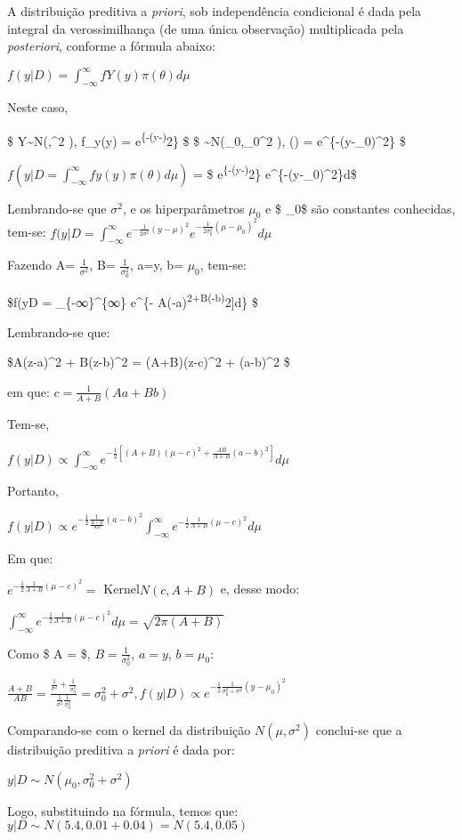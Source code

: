 \documentclass[
]{article}
\begin{document}
A distribuição preditiva a \emph{priori}, sob independência condicional
é dada pela integral da verossimilhança (de uma única observação)
multiplicada pela \emph{posteriori}, conforme a fórmula abaixo:

\(f(y|D) = \int_{-∞}^{∞} fY(y)π(θ)dμ\)

Neste caso,

\$ Y\textasciitilde N(\mu,\sigma\^{}2 ), f\_y(y) =
e\textsuperscript{\{-(y-\mu)}2\}
\$ \$ \theta\textasciitilde N(\mu\_0,\sigma\_0\^{}2 ), \pi(\theta) =
e\^{}\{-(y-\mu\_0)\^{}2\}
\$

\(f(y|D = \int_{-∞}^{∞}fy(y)π(θ)dμ )\) = \$
e\textsuperscript{\{-(y-\mu)}2\}
e\^{}\{-(y-\mu\_0)\^{}2\}d\mu\$

Lembrando-se que \(\sigma^2\), e os hiperparâmetros \(\mu_0\) e \$
\sigma\_0\$ são constantes conhecidas, tem-se:
\(f(y|D = \int_{-∞}^{∞} e^{-\frac{1}{2 \sigma^2}(y-\mu)^2}e^{-\frac{1}{2 \sigma_0^2}(\mu-\mu_0)^2}d\mu\)

Fazendo A= \(\frac{1}{\sigma^2}\), B= \(\frac{1}{\sigma_0^2}\), a=y, b=
\(\mu_0\), tem-se:

\$f(y\textbar D = \int\_\{-∞\}\^{}\{∞\} e\^{}\{-
\frac{1}{2}{[}A(\mu-a)\textsuperscript{2+B(\mu-b)}2{]}d\mu\} \$

Lembrando-se que:

\$A(z-a)\^{}2 + B(z-b)\^{}2 = (A+B)(z-c)\^{}2 + (a-b)\^{}2
\$

em que: \(c = \frac{1}{A+B}(Aa+Bb)\)

Tem-se,

\(f(y|D)∝\int_{-∞}^{∞}e^{-\frac{1}{2}[(A+B)(μ−c)^2+\frac{AB}{A+B}(a-b)^2]}d\mu\)

Portanto,

\(f(y|D)∝e^{-\frac{1}{2}\frac{1}{\frac{A+B}{AB}}(a-b)^2}\int_{-∞}^{∞}e^{-\frac{1}{2}\frac{1}{A+B}(μ−c)^2}d\mu\)

Em que:

\(e^{-\frac{1}{2}\frac{1}{A+B}(\mu−c)^2} =\) Kernel\(N(c, A+B)\) e,
desse modo:

\(\int_{-∞}^{∞}e^{-\frac{1}{2}\frac{1}{A+B}(\mu−c)^2}dμ = \sqrt{2\pi(A+B)}\)

Como \$ A = \$, \(B = \frac{1}{\sigma_0^2}\),
\(a = y\), \(b = \mu_0\):

\(\frac{A+B}{AB} = \frac{\frac{1}{\sigma^2} + \frac{1}{\sigma_0^2}}{\frac{1}{\sigma^2}\frac{1}{\sigma_0^2}} = \sigma_0^2+\sigma^2, f (y |D) ∝ e^{-\frac{1}{2}\frac{1}{\sigma_0^2+ \sigma^2}(y-\mu_0)^2}\)

Comparando-se com o kernel da distribuição \(N(\mu, \sigma^2)\)
conclui-se que a distribuição preditiva a \emph{priori} é dada por:

\(y |D ∼ N(\mu_0,\sigma_0^2 + \sigma^2)\)

Logo, substituindo na fórmula, temos que:
\(y|D∼N(5.4,0.01+0.04) = N(5.4,0.05)\)
\end{document}
